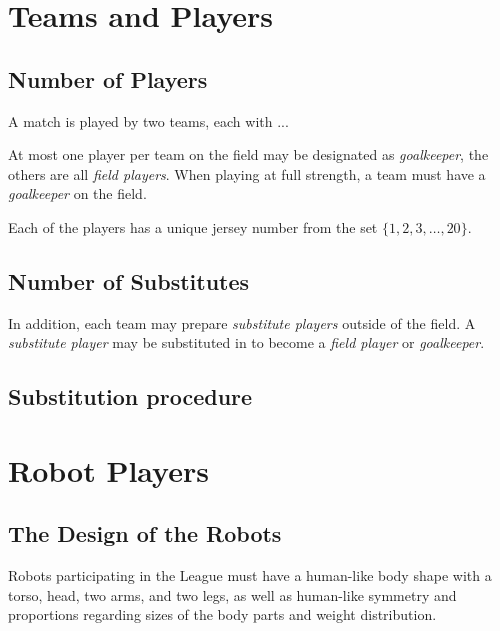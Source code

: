 \section{Teams and Players}
\label{sec:teams_and_players}

\subsection{Number of Players}
\label{sec:number_of_players}
A match is played by two teams, each with ...

At most one player per team on the field may be designated as \emph{goalkeeper}, the others are all \emph{field players}.
When playing at full strength, a team must have a \emph{goalkeeper} on the field.

Each of the players has a unique jersey number from the set $\{1, 2, 3, \ldots, 20\}$.
\subsection{Number of Substitutes}
\label{sec:number_of_substitutes}
In addition, each team may prepare \emph{substitute players} outside of the field.
A \emph{substitute player} may be substituted in to become a \emph{field player} or \emph{goalkeeper}.

\subsection{Substitution procedure}

\section{Robot Players}
\label{sec:robot_players}

\subsection{The Design of the Robots}
\label{sec:design_of_robots}
Robots participating in the \leaguenameabbr League must have a human-like body shape with a torso, head, two arms, and two legs, as well as human-like symmetry and proportions regarding sizes of the body parts and weight distribution. 

